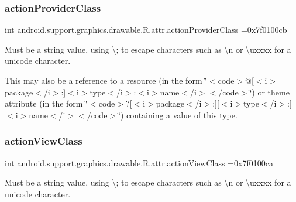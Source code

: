 \subsubsection{\texorpdfstring{action\+Provider\+Class}{actionProviderClass}}
{\footnotesize\ttfamily int android.\+support.\+graphics.\+drawable.\+R.\+attr.\+action\+Provider\+Class =0x7f0100cb\hspace{0.3cm}{\ttfamily [static]}}

Must be a string value, using \textquotesingle{}\textbackslash{};\textquotesingle{} to escape characters such as \textquotesingle{}\textbackslash{}n\textquotesingle{} or \textquotesingle{}\textbackslash{}uxxxx\textquotesingle{} for a unicode character. 

This may also be a reference to a resource (in the form \char`\"{}$<$code$>$@\mbox{[}$<$i$>$package$<$/i$>$\+:\mbox{]}$<$i$>$type$<$/i$>$\+:$<$i$>$name$<$/i$>$$<$/code$>$\char`\"{}) or theme attribute (in the form \char`\"{}$<$code$>$?\mbox{[}$<$i$>$package$<$/i$>$\+:\mbox{]}\mbox{[}$<$i$>$type$<$/i$>$\+:\mbox{]}$<$i$>$name$<$/i$>$$<$/code$>$\char`\"{}) containing a value of this type. \mbox{\label{classandroid_1_1support_1_1graphics_1_1drawable_1_1R_1_1attr_a82f9680d9ad136980b090daef1147c6c}} 
\subsubsection{\texorpdfstring{action\+View\+Class}{actionViewClass}}
{\footnotesize\ttfamily int android.\+support.\+graphics.\+drawable.\+R.\+attr.\+action\+View\+Class =0x7f0100ca\hspace{0.3cm}{\ttfamily [static]}}

Must be a string value, using \textquotesingle{}\textbackslash{};\textquotesingle{} to escape characters such as \textquotesingle{}\textbackslash{}n\textquotesingle{} or \textquotesingle{}\textbackslash{}uxxxx\textquotesingle{} for a unicode character. 

